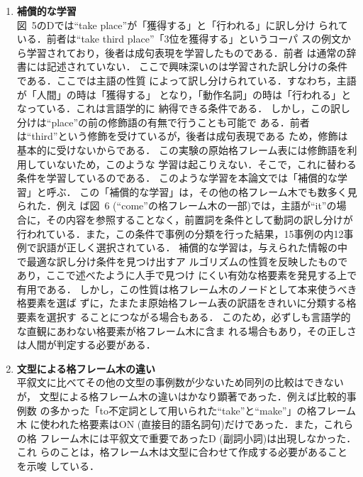 \begin{enumerate}
(II)に相当するのは同一の文でありながら動詞の訳が違う場合である．
``make''のコーパスには``I am going to make it.''という同一の文章で
``make''の訳語が「作る」と「成功する」になる2通りの場合が収録されてい
る\footnote{人手で翻訳した際には当然文脈を参照している．4.4節(4)，4.5
  節参照．}．これらの訳語はこの文の格要素だけで訳し分けることはできな
いため，誤りを含んだまま枝の生成は停止せざるを得ない．この誤りは文脈を
扱わない本手法の限界を示すものである．

\item {\bf 補償的な学習}\\
  図~5のDでは``take place''が「獲得する」と「行われる」に訳し分け
  られている．前者は``take third place''「3位を獲得する」というコーパ
  スの例文から学習されており，後者は成句表現を学習したものである．前者
  は通常の辞書には記述されていない．
  ここで興味深いのは学習された訳し分けの条件である．ここでは主語の性質
  によって訳し分けられている．すなわち，主語が「人間」の時は「獲得する」
  となり，「動作名詞」の時は「行われる」となっている．これは言語学的に
  納得できる条件である．
  しかし，この訳し分けは``place''の前の修飾語の有無で行うことも可能で
  ある．前者は``third''という修飾を受けているが，後者は成句表現である
  ため，修飾は基本的に受けないからである．
  この実験の原始格フレーム表には修飾語を利用していないため，このような
  学習は起こりえない．そこで，これに替わる条件を学習しているのである．
  このような学習を本論文では「補償的な学習」と呼ぶ．
  この「補償的な学習」は，その他の格フレーム木でも数多く見られた．例え
  ば図~6 (``come''の格フレーム木の一部)では，主語が``it''の場
  合に，その内容を参照することなく，前置詞を条件として動詞の訳し分けが
  行われている．また，この条件で事例の分類を行った結果，15事例の内12事
  例で訳語が正しく選択されている．
  補償的な学習は，与えられた情報の中で最適な訳し分け条件を見つけ出すア
  ルゴリズムの性質を反映したものであり，ここで述べたように人手で見つけ
  にくい有効な格要素を発見する上で有用である．
  しかし，この性質は格フレーム木のノードとして本来使うべき格要素を選ば
  ずに，たまたま原始格フレーム表の訳語をきれいに分類する格要素を選択す
  ることにつながる場合もある．
  このため，必ずしも言語学的な直観にあわない格要素が格フレーム木に含ま
  れる場合もあり，その正しさは人間が判定する必要がある．

\item {\bf 文型による格フレーム木の違い}\\
  平叙文に比べてその他の文型の事例数が少ないため同列の比較はできないが，
  文型による格フレーム木の違いはかなり顕著であった．例えば比較的事例数
  の多かった「to不定詞として用いられた``take''と``make''」の格フレーム木
  に使われた格要素はON (直接目的語名詞句)だけであった．また，これらの格
  フレーム木には平叙文で重要であったD (副詞小詞)は出現しなかった．これ
  らのことは，格フレーム木は文型に合わせて作成する必要があることを示唆
  している．
\end{enumerate}

